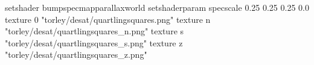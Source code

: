 setshader bumpspecmapparallaxworld
setshaderparam specscale 0.25 0.25 0.25 0.0
texture 0 "torley/desat/quartlingsquares.png"
texture n "torley/desat/quartlingsquares_n.png"
texture s "torley/desat/quartlingsquares_s.png"
texture z "torley/desat/quartlingsquares_z.png"

